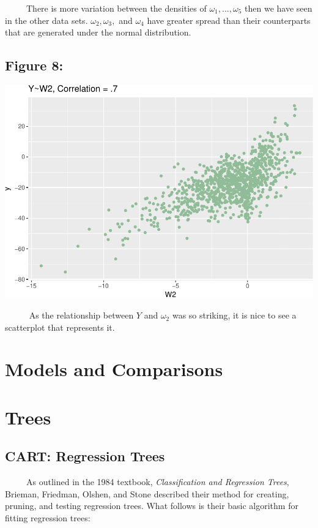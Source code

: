 \documentclass[12pt,twoside]{reedthesis}
\begin{document}
  ~~~~~There is more variation between the densities of
  \(\omega_1,...,\omega_5\) then we have seen in the other data sets.
  \(\omega_2,\omega_3,\) and \(\omega_4\) have greater spread than their
  counterparts that are generated under the normal distribution.
  
  \subsection{Figure 8:}\label{figure-8}
  
  \begin{center}\includegraphics{Thesis_files/figure-latex/unnamed-chunk-9-1} \end{center}
  
  ~~~~~ As the relationship between \(Y\) and \(\omega_2\) was so
  striking, it is nice to see a scatterplot that represents it.
  
  \section{Models and Comparisons}\label{models-and-comparisons}
  
  \section{Trees}\label{trees-1}
  
  \subsection{CART: Regression Trees}\label{cart-regression-trees}
  
  ~~~~~As outlined in the 1984 textbook, \emph{Classification and
  Regression Trees}, Brieman, Friedman, Olshen, and Stone described their
  method for creating, pruning, and testing regression trees. What follows
  is their basic algorithm for fitting regression trees:
  
\end{document}
